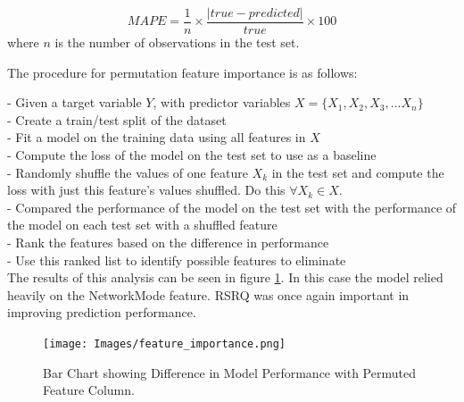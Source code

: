 \begin{equation}
MAPE = \frac{1}{n} \times \frac{\left|true-predicted\right|}{true} \times 100
\end{equation}
where $n$ is the number of observations in the test set.

The procedure for permutation feature importance is as follows:

- Given a target variable $Y$, with predictor variables $X=\{X_1,X_2,X_3,...X_n\}$ \\
- Create a train/test split of the dataset \\
- Fit a model on the training data using all features in $X$ \\
- Compute the loss of the model on the test set to use as a baseline \\
- Randomly shuffle the values of one feature $X_k$ in the test set and compute the loss with just this feature's values shuffled. Do this $\forall X_k \in X$. \\
- Compared the performance of the model on the test set with the performance of the model on each test set with a shuffled feature \\
- Rank the features based on the difference in performance \\
- Use this ranked list to identify possible features to eliminate \\

The results of this analysis can be seen in figure \ref{fig:feature_importance}. In this case the model relied heavily on the NetworkMode feature. RSRQ was once again important in improving prediction performance. 
\newpage
\begin{figure}[h]
\texttt{[image: Images/feature\_importance.png]}
\centering
\caption{Bar Chart showing Difference in Model Performance with Permuted Feature Column.}
\label{fig:feature_importance}
\end{figure}